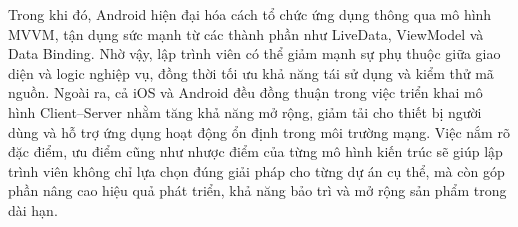     \begin{flushleft}
        \hspace*{0.8cm}Trong khi đó, Android hiện đại hóa cách tổ chức ứng dụng thông qua mô hình MVVM, tận dụng sức mạnh từ các thành phần như LiveData, ViewModel và Data Binding. Nhờ vậy, lập trình viên có thể giảm mạnh sự phụ thuộc giữa giao diện và logic nghiệp vụ, đồng thời tối ưu khả năng tái sử dụng và kiểm thử mã nguồn. Ngoài ra, cả iOS và Android đều đồng thuận trong việc triển khai mô hình Client–Server nhằm tăng khả năng mở rộng, giảm tải cho thiết bị người dùng và hỗ trợ ứng dụng hoạt động ổn định trong môi trường mạng. Việc nắm rõ đặc điểm, ưu điểm cũng như nhược điểm của từng mô hình kiến trúc sẽ giúp lập trình viên không chỉ lựa chọn đúng giải pháp cho từng dự án cụ thể, mà còn góp phần nâng cao hiệu quả phát triển, khả năng bảo trì và mở rộng sản phẩm trong dài hạn.
    \end{flushleft}
